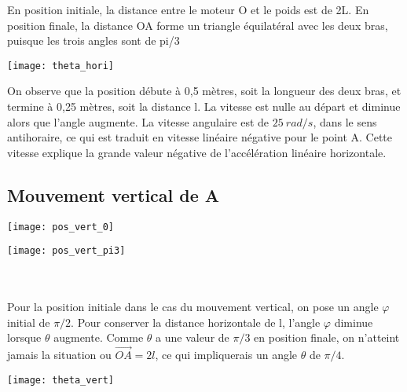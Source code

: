 \documentclass{udes_rapport} %
\begin{document}
En position initiale, la distance entre le moteur O et le poids est de 2L. 
En position finale, la distance OA forme un triangle équilatéral avec les deux bras, puisque les trois
angles sont de pi/3

\begin{center}
	\centering
	\texttt{[image: theta\_hori]}
	\label{composantes_horizontale_theta}
\end{center}

On observe que la position débute à 0,5 mètres, soit la longueur des deux bras, et termine à 0,25 mètres, soit la distance l.
La vitesse est nulle au départ et diminue alors que l'angle augmente. La vitesse angulaire est de $25\:rad/s$, dans le sens antihoraire, ce qui est
traduit en vitesse linéaire négative pour le point A. Cette vitesse explique la grande valeur négative de l'accélération linéaire horizontale.

\subsection{Mouvement vertical de A}

\noindent\begin{minipage}{\textwidth} 
\begin{minipage}{0.5\textwidth}
  \centering
  \texttt{[image: pos\_vert\_0]}
  \label{pos_vert:position_verticale_initiale}
\end{minipage}%
\begin{minipage}{0.5\textwidth}
  \centering 
  \texttt{[image: pos\_vert\_pi3]} 
  \label{pos_vert:position_verticale_finale} 
\end{minipage} 
\label{pos_vert} 
\end{minipage}
\\ \\
Pour la position initiale dans le cas du mouvement vertical, on pose un angle $\varphi$ initial de $\pi/2$. 
Pour conserver la distance horizontale de l, l'angle $\varphi$ diminue lorsque $\theta$ augmente. 
Comme $\theta$ a une valeur de $\pi/3$ en position finale, on n'atteint jamais la situation ou $\overrightarrow{OA} = 2l$, 
ce qui impliquerais un angle $\theta$ de $\pi/4$.

\begin{center}
	\centering
	\texttt{[image: theta\_vert]}
	\label{composantes_verticale_theta}
\end{center}
\end{document}
